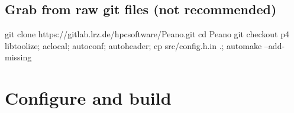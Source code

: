 \subsection{Grab from raw git files (not recommended)}

\begin{code}
 git clone https://gitlab.lrz.de/hpcsoftware/Peano.git
 cd Peano
 git checkout p4
 libtoolize; aclocal; autoconf; autoheader; cp src/config.h.in .; automake --add-missing
\end{code}

\section{Configure and build}




